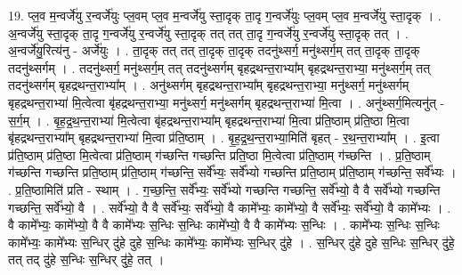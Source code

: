 \documentclass[17pt]{extarticle}
\begin{document}
19. प्ल॒व म॒न्वर्जे॑यु र॒न्वर्जे॑युः प्ल॒वम् प्ल॒व म॒न्वर्जे॑यु स्ता॒दृक् ता॒दृ ग॒न्वर्जे॑युः प्ल॒वम् प्ल॒व म॒न्वर्जे॑यु स्ता॒दृक् । . अ॒न्वर्जे॑यु स्ता॒दृक् ता॒दृ ग॒न्वर्जे॑यु र॒न्वर्जे॑यु स्ता॒दृक् तत् तत् ता॒दृ ग॒न्वर्जे॑यु र॒न्वर्जे॑यु स्ता॒दृक् तत् । . अ॒न्वर्जे॑यु॒रित्य॑नु - अर्जे॑युः । . ता॒दृक् तत् तत् ता॒दृक् ता॒दृक् तदनु॑थ्सर्ग॒ मनु॑थ्सर्ग॒म् तत् ता॒दृक् ता॒दृक् तदनु॑थ्सर्गम् । . तदनु॑थ्सर्ग॒ मनु॑थ्सर्ग॒म् तत् तदनु॑थ्सर्गम् बृहद्रथन्त॒राभ्या᳚म् बृहद्रथन्त॒राभ्या॒ मनु॑थ्सर्ग॒म् तत् तदनु॑थ्सर्गम् बृहद्रथन्त॒राभ्या᳚म् । . अनु॑थ्सर्गम् बृहद्रथन्त॒राभ्या᳚म् बृहद्रथन्त॒राभ्या॒ मनु॑थ्सर्ग॒ मनु॑थ्सर्गम् बृहद्रथन्त॒राभ्या॑ मि॒त्वेत्वा बृ॑हद्रथन्त॒राभ्या॒ मनु॑थ्सर्ग॒ मनु॑थ्सर्गम् बृहद्रथन्त॒राभ्या॑ मि॒त्वा । . अनु॑थ्सर्ग॒मित्यनु॑त् - स॒र्ग॒म् । . बृ॒ह॒द्र॒थ॒न्त॒राभ्या॑ मि॒त्वेत्वा बृ॑हद्रथन्त॒राभ्या᳚म् बृहद्रथन्त॒राभ्या॑ मि॒त्वा प्र॑ति॒ष्ठाम् प्र॑ति॒ष्ठा मि॒त्वा बृ॑हद्रथन्त॒राभ्या᳚म् बृहद्रथन्त॒राभ्या॑ मि॒त्वा प्र॑ति॒ष्ठाम् । . बृ॒ह॒द्र॒थ॒न्त॒राभ्या॒मिति॑ बृहत् - र॒थ॒न्त॒राभ्या᳚म् । . इ॒त्वा प्र॑ति॒ष्ठाम् प्र॑ति॒ष्ठा मि॒त्वेत्वा प्र॑ति॒ष्ठाम् ग॑च्छन्ति गच्छन्ति प्रति॒ष्ठा मि॒त्वेत्वा प्र॑ति॒ष्ठाम् ग॑च्छन्ति । . प्र॒ति॒ष्ठाम् ग॑च्छन्ति गच्छन्ति प्रति॒ष्ठाम् प्र॑ति॒ष्ठाम् ग॑च्छन्ति॒ सर्वे᳚भ्यः॒ सर्वे᳚भ्यो गच्छन्ति प्रति॒ष्ठाम् प्र॑ति॒ष्ठाम् ग॑च्छन्ति॒ सर्वे᳚भ्यः । . प्र॒ति॒ष्ठामिति॑ प्रति - स्थाम् । . ग॒च्छ॒न्ति॒ सर्वे᳚भ्यः॒ सर्वे᳚भ्यो गच्छन्ति गच्छन्ति॒ सर्वे᳚भ्यो॒ वै वै सर्वे᳚भ्यो गच्छन्ति गच्छन्ति॒ सर्वे᳚भ्यो॒ वै । . सर्वे᳚भ्यो॒ वै वै सर्वे᳚भ्यः॒ सर्वे᳚भ्यो॒ वै कामे᳚भ्यः॒ कामे᳚भ्यो॒ वै सर्वे᳚भ्यः॒ सर्वे᳚भ्यो॒ वै कामे᳚भ्यः । . वै कामे᳚भ्यः॒ कामे᳚भ्यो॒ वै वै कामे᳚भ्यः स॒न्धिः स॒न्धिः कामे᳚भ्यो॒ वै वै कामे᳚भ्यः स॒न्धिः । . कामे᳚भ्यः स॒न्धिः स॒न्धिः कामे᳚भ्यः॒ कामे᳚भ्यः स॒न्धिर् दु॑हे दुहे स॒न्धिः कामे᳚भ्यः॒ कामे᳚भ्यः स॒न्धिर् दु॑हे । . स॒न्धिर् दु॑हे दुहे स॒न्धिः स॒न्धिर् दु॑हे॒ तत् तद् दु॑हे स॒न्धिः स॒न्धिर् दु॑हे॒ तत् । \newline
\end{document}
